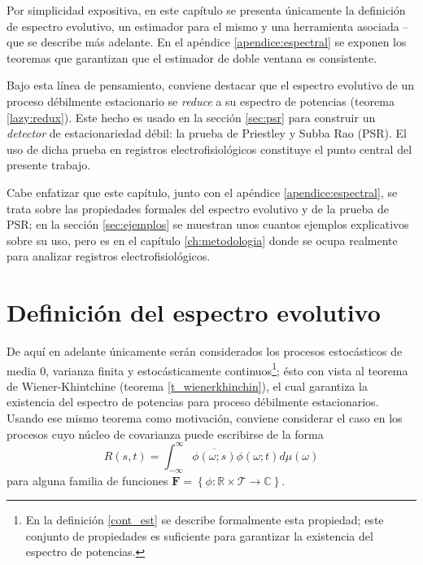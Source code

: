 \documentclass[12pt,letterpaper]{book}
\newcommand{\R}{\mathbb{R}}
\newcommand{\C}{\mathbb{C}}
\newcommand{\intR}{\int_{-\infty}^{\infty}}
\newcommand{\ef}{\mathbf{F}}
\begin{document}
Por simplicidad expositiva, en este capítulo se presenta únicamente la definición de espectro evolutivo, un estimador para el mismo y una herramienta asociada --que se describe más adelante.
%
En el apéndice \ref{apendice:espectral} se exponen los teoremas que garantizan que el estimador de doble ventana es consistente.
%

Bajo esta línea de pensamiento, conviene destacar que el espectro evolutivo de un proceso débilmente estacionario se \textit{reduce} a su espectro de potencias (teorema \ref{lazy:redux}). 
%
Este hecho es usado en la sección \ref{sec:psr} para construir un \textit{detector} de estacionariedad débil: la prueba de Priestley y Subba Rao (PSR).
%
El uso de dicha prueba en registros electrofisiológicos constituye el punto central del presente trabajo.

Cabe enfatizar que este capítulo, junto con el apéndice \ref{apendice:espectral}, se trata sobre las propiedades formales del espectro evolutivo y de la prueba de PSR; en la sección \ref{sec:ejemplos} se muestran unos cuantos ejemplos explicativos sobre su uso, pero es en el capítulo \ref{ch:metodologia} donde se ocupa realmente para analizar registros electrofisiológicos.

\section{Definición del espectro evolutivo}

De aquí en adelante únicamente serán considerados los procesos estocásticos de media 0, varianza finita y estocásticamente continuos\footnote{En la definición \ref{cont_est} se describe formalmente esta propiedad; este conjunto de propiedades es suficiente para garantizar la existencia del espectro de potencias.}; ésto con vista al teorema de Wiener-Khintchine (teorema \ref{t_wienerkhinchin}), el cual garantiza la existencia del espectro de potencias para proceso débilmente estacionarios.
%
Usando ese mismo teorema como motivación, conviene considerar el caso en los procesos cuyo núcleo de covarianza puede escribirse de la forma
\begin{equation}
R(s,t) = \intR \overline{\phi(\omega;s)}\phi(\omega;t) d\mu(\omega)
\end{equation}
para alguna familia de funciones $\ef = \left\{ \phi: \R \times \mathcal{T} \rightarrow \C \right\}$. 
%
\end{document}
